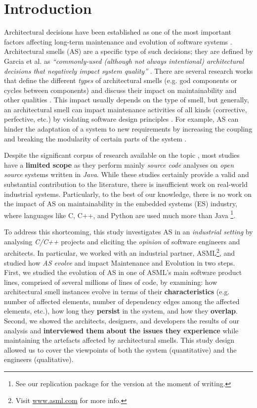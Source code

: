 \section{Introduction}
Architectural decisions have been established as one of the most important factors affecting long-term maintenance and evolution of software systems \cite{Ernst2015}.
Architectural smells (AS) are a specific type of such decisions; they are defined by Garcia et al. as \emph{``commonly-used (although not always intentional) architectural decisions that negatively impact system quality''}  \cite{Garcia2009}.
There are several research works that define the different \emph{types} of architectural smells (e.g. god components or cycles between components) and discuss their impact on maintainability and other qualities \cite{Lippert2006,Arcelli2016,Mo2015,Le2016,Garcia2009}.
This impact usually depends on the type of smell, but generally, an architectural smell can impact maintenance activities of all kinds (corrective, perfective, etc.) by violating software design principles \cite{Azadi2019}.
For example, AS can hinder the adaptation of a system to new requirements by increasing the coupling and breaking the modularity of certain parts of the system \cite{Azadi2019}.

Despite the significant corpus of research available on the topic \cite{Verdecchia2018}, most studies have a \textbf{limited scope} as they perform mainly \emph{source code} analyses on \emph{open source} systems written in \emph{Java}. 
While these studies certainly provide a valid and substantial contribution to the literature, there is insufficient work on real-world industrial systems. Particularly,  to the best of our knowledge, there is no work on the impact of AS on maintainability in the embedded systems (ES) industry,
where  languages like C, C++, and Python are used much more than Java \cite{Tiobe2021}\footnote{See our replication package for the version at the moment of writing.}.

To address this shortcoming, this study investigates AS in an \emph{industrial setting} by analysing \emph{C/C++} projects and eliciting the \emph{opinion} of software engineers and architects.
In particular, we worked with an industrial partner, ASML\footnote{\label{fn:asml}Visit \url{www.asml.com} for more info.}, and studied how \emph{AS evolve} and impact Maintenance and Evolution \cite{Vliet2008} in two steps.
First, we studied  the evolution of AS in one of ASML's main software product lines, comprised of several millions of lines of code, by examining: how architectural smell instances evolve in terms of their \textbf{characteristics} (e.g. number of affected elements, number of dependency edges among the affected elements, etc.), how long they \textbf{persist} in the system, and how they \textbf{overlap}.
Second, we showed the architects, designers, and developers the results of our analysis and \textbf{interviewed them about the issues they experience} while maintaining the artefacts affected by architectural smells.
This study design allowed us to cover the viewpoints of both the system (quantitative) and the engineers (qualitative). 

